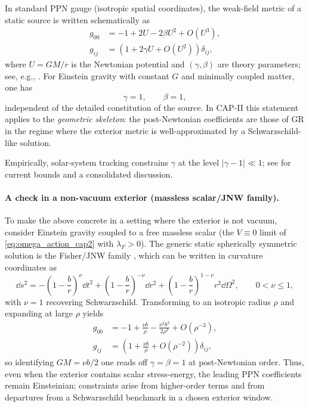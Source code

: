 In standard PPN gauge (isotropic spatial coordinates), the weak-field metric of a static source is written schematically as
\begin{align}
  g_{00} &= -1 + 2U - 2\beta U^2 + O(U^3),\\
  g_{ij} &= \left(1 + 2\gamma U + O(U^2)\right)\delta_{ij},
\end{align}
where $U=GM/r$ is the Newtonian potential and $(\gamma,\beta)$ are theory parameters; see, e.g., \cite{Will1993,Will2014}.
For Einstein gravity with constant $G$ and minimally coupled matter, one has
\begin{equation}
  \gamma = 1,
  \qquad
  \beta = 1,
\end{equation}
independent of the detailed constitution of the source.
In CAP-II this statement applies to the \emph{geometric skeleton}: the post-Newtonian coefficients are those of GR in the regime where the exterior metric is well-approximated by a Schwarzschild-like solution.
\par
\noindent Empirically, solar-system tracking constrains $\gamma$ at the level $|\gamma-1|\ll 1$; see \cite{Will2014} for current bounds and a consolidated discussion.

\paragraph{A check in a non-vacuum exterior (massless scalar/JNW family).}
To make the above concrete in a setting where the exterior is not vacuum, consider Einstein gravity coupled to a free massless scalar (the $V\equiv 0$ limit of \eqref{eq:omega_action_cap2} with $\lambda_F>0$).
The generic static spherically symmetric solution is the Fisher/JNW family \cite{Fisher1948,JanisNewmanWinicour1968}, which can be written in curvature coordinates as
\begin{equation}
  \dd s^2
  = -\left(1-\frac{b}{r}\right)^{\nu}\dd t^2
  + \left(1-\frac{b}{r}\right)^{-\nu}\dd r^2
  + \left(1-\frac{b}{r}\right)^{1-\nu} r^2\dd\Omega^2,
  \qquad 0<\nu\le 1,
  \label{eq:jnw_metric}
\end{equation}
with $\nu=1$ recovering Schwarzschild.
Transforming to an isotropic radius $\rho$ and expanding at large $\rho$ yields
\begin{align}
  g_{00} &= -1 + \frac{\nu b}{\rho} - \frac{\nu^2 b^2}{2\rho^2} + O(\rho^{-3}),\\
  g_{ij} &= \left(1 + \frac{\nu b}{\rho} + O(\rho^{-2})\right)\delta_{ij},
\end{align}
so identifying $GM=\nu b/2$ one reads off $\gamma=\beta=1$ at post-Newtonian order.
Thus, even when the exterior contains scalar stress-energy, the leading PPN coefficients remain Einsteinian; constraints arise from higher-order terms and from departures from a Schwarzschild benchmark in a chosen exterior window.

